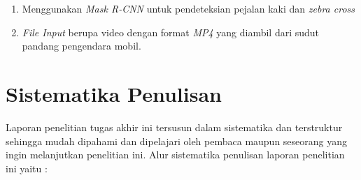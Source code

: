 \begin{enumerate}[nolistsep]

  \item Menggunakan \textit{Mask R-CNN} untuk pendeteksian pejalan kaki dan \textit{zebra cross}
  \item \textit{File Input} berupa video dengan format \textit{MP4} yang diambil dari sudut pandang pengendara mobil. 

\end{enumerate}

\section{Sistematika Penulisan}
\label{sec:sistematikapenulisan}

Laporan penelitian tugas akhir ini tersusun dalam sistematika dan terstruktur sehingga mudah dipahami dan dipelajari oleh pembaca maupun seseorang yang ingin melanjutkan penelitian ini. Alur sistematika penulisan laporan penelitian ini yaitu :

